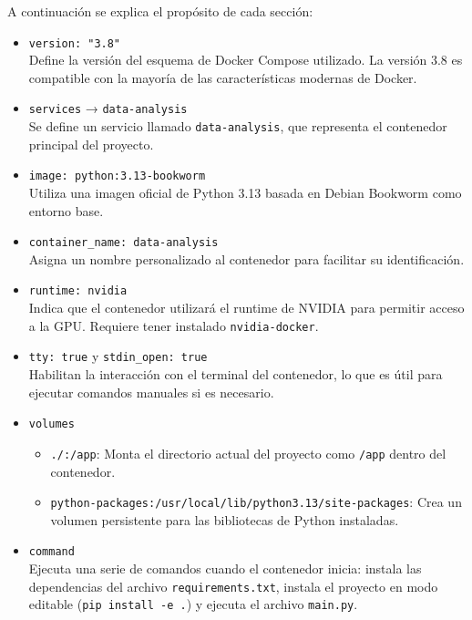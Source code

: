 A continuación se explica el propósito de cada sección:

\begin{itemize}
  \item \texttt{version: "3.8"}\\
  Define la versión del esquema de Docker Compose utilizado. La versión 3.8 es compatible con la mayoría de las características modernas de Docker.

  \item \texttt{services} → \texttt{data-analysis}\\
  Se define un servicio llamado \texttt{data-analysis}, que representa el contenedor principal del proyecto.

  \item \texttt{image: python:3.13-bookworm}\\
  Utiliza una imagen oficial de Python 3.13 basada en Debian Bookworm como entorno base.

  \item \texttt{container\_name: data-analysis}\\
  Asigna un nombre personalizado al contenedor para facilitar su identificación.

  \item \texttt{runtime: nvidia}\\
  Indica que el contenedor utilizará el runtime de NVIDIA para permitir acceso a la GPU. Requiere tener instalado \texttt{nvidia-docker}.

  \item \texttt{tty: true} y \texttt{stdin\_open: true}\\
  Habilitan la interacción con el terminal del contenedor, lo que es útil para ejecutar comandos manuales si es necesario.

  \item \texttt{volumes}\\
  \begin{itemize}
    \item \texttt{./:/app}: Monta el directorio actual del proyecto como \texttt{/app} dentro del contenedor.
    \item \texttt{python-packages:/usr/local/lib/python3.13/site-packages}: Crea un volumen persistente para las bibliotecas de Python instaladas.
  \end{itemize}

  \item \texttt{command}\\
  Ejecuta una serie de comandos cuando el contenedor inicia: instala las dependencias del archivo \texttt{requirements.txt}, instala el proyecto en modo editable (\texttt{pip install -e .}) y ejecuta el archivo \texttt{main.py}.


\end{itemize}
